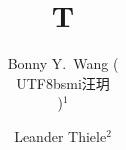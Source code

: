 \documentclass{article}
\usepackage{CJK}
\let\BeginEnvironment=\begin
\def\begin#1{\let\SaveBegEnd=\BeginEnvironment\SaveBegEnd{#1}}

\title{T}
\author{Bonny Y.~Wang ({\begin{CJK*}{UTF8}{bsmi}汪玥\end{CJK*}})$^{1}$ \and Leander Thiele$^{2}$}
\maketitle
Hi.


